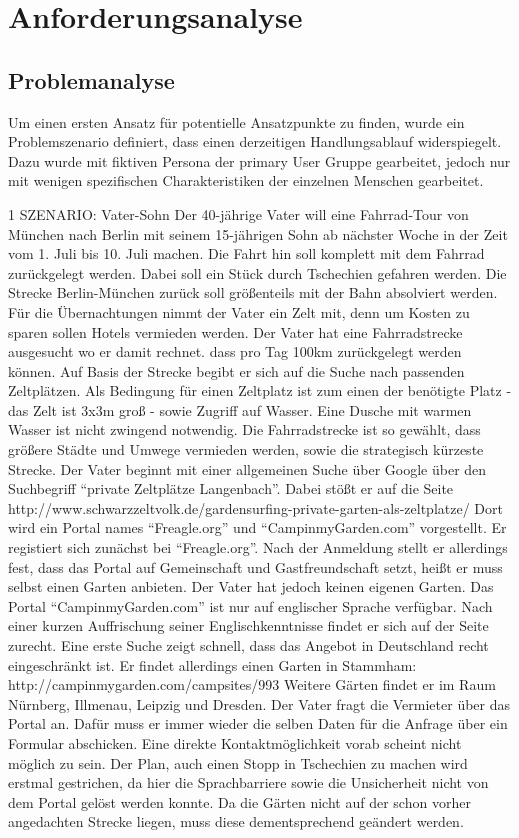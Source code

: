 
\section{Anforderungsanalyse}

\subsection{Problemanalyse}
Um einen ersten Ansatz für potentielle Ansatzpunkte zu finden, wurde ein Problemszenario definiert, dass einen derzeitigen Handlungsablauf widerspiegelt. Dazu wurde mit fiktiven Persona der primary User Gruppe gearbeitet, jedoch nur mit wenigen spezifischen Charakteristiken der einzelnen Menschen gearbeitet.

1 SZENARIO: Vater-Sohn
Der 40-jährige Vater will eine Fahrrad-Tour von München nach Berlin mit seinem 15-jährigen Sohn ab nächster Woche in der Zeit vom 1. Juli bis 10. Juli machen. Die Fahrt hin soll komplett mit dem Fahrrad zurückgelegt werden. Dabei soll ein Stück durch Tschechien gefahren werden. Die Strecke Berlin-München zurück soll größenteils mit der Bahn absolviert werden. Für die Übernachtungen nimmt der Vater ein Zelt mit, denn um Kosten zu sparen sollen Hotels vermieden werden.
Der Vater hat eine Fahrradstrecke ausgesucht wo er damit rechnet. dass pro Tag 100km zurückgelegt werden können. Auf Basis der Strecke begibt er sich auf die Suche nach passenden Zeltplätzen. Als Bedingung für einen Zeltplatz ist zum einen der benötigte Platz - das Zelt ist 3x3m groß - sowie Zugriff auf Wasser. Eine Dusche mit warmen Wasser ist nicht zwingend notwendig.
Die Fahrradstrecke ist so gewählt, dass größere Städte und Umwege vermieden werden, sowie die strategisch kürzeste Strecke.
Der Vater beginnt mit einer allgemeinen Suche über Google über den Suchbegriff “private Zeltplätze Langenbach”. Dabei stößt er auf die Seite http://www.schwarzzeltvolk.de/gardensurfing-private-garten-als-zeltplatze/
Dort wird ein Portal names “Freagle.org” und “CampinmyGarden.com” vorgestellt. Er registiert sich zunächst bei “Freagle.org”. Nach der Anmeldung stellt er allerdings fest, dass das Portal auf Gemeinschaft und Gastfreundschaft setzt, heißt er muss selbst einen Garten anbieten. Der Vater hat jedoch keinen eigenen Garten.
Das Portal “CampinmyGarden.com” ist nur auf englischer Sprache verfügbar. Nach einer kurzen Auffrischung seiner Englischkenntnisse findet er sich auf der Seite zurecht. Eine erste Suche zeigt schnell, dass das Angebot in Deutschland recht eingeschränkt ist.
Er findet allerdings einen Garten in Stammham: http://campinmygarden.com/campsites/993
Weitere Gärten findet er im Raum Nürnberg, Illmenau, Leipzig und Dresden. Der Vater fragt die Vermieter über das Portal an. Dafür muss er immer wieder die selben Daten für die Anfrage über ein Formular abschicken. Eine direkte Kontaktmöglichkeit vorab scheint nicht möglich zu sein.
Der Plan, auch einen Stopp in Tschechien zu machen wird erstmal gestrichen, da hier die Sprachbarriere sowie die Unsicherheit nicht von dem Portal gelöst werden konnte.
Da die Gärten nicht auf der schon vorher angedachten Strecke liegen, muss diese dementsprechend geändert werden.

